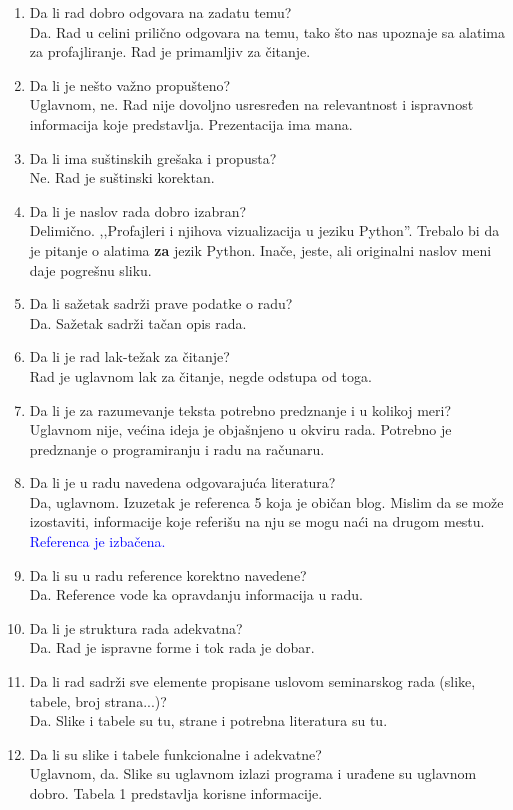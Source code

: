 \documentclass[a4paper]{report}
\newcommand{\odgovor}[1]{\textcolor{blue}{#1}}
\begin{document}
\begin{enumerate}
\item Da li rad dobro odgovara na zadatu temu?\\ Da. Rad u celini prilično odgovara na temu, tako što nas upoznaje sa alatima za profajliranje. Rad je primamljiv za čitanje.
\item Da li je nešto važno propušteno?\\ Uglavnom, ne. Rad nije dovoljno usresređen na relevantnost i ispravnost informacija koje predstavlja. Prezentacija ima mana.
\item Da li ima suštinskih grešaka i propusta?\\ Ne. Rad je suštinski korektan.
\item Da li je naslov rada dobro izabran?\\ Delimično. ,,Profajleri i njihova vizualizacija u jeziku Python''. Trebalo bi da je pitanje o alatima \textbf{za} jezik Python. Inače, jeste, ali originalni naslov meni daje pogrešnu sliku.
\item Da li sažetak sadrži prave podatke o radu?\\ Da. Sažetak sadrži tačan opis rada.
\item Da li je rad lak-težak za čitanje?\\ Rad je uglavnom lak za čitanje, negde odstupa od toga.
\item Da li je za razumevanje teksta potrebno predznanje i u kolikoj meri?\\ Uglavnom nije, većina ideja je objašnjeno u okviru rada. Potrebno je predznanje o programiranju i radu na računaru.
\item Da li je u radu navedena odgovarajuća literatura?\\ Da, uglavnom. Izuzetak je referenca 5 koja je običan blog. Mislim da se može izostaviti, informacije koje referišu na nju se mogu naći na drugom mestu.\\
\odgovor{Referenca je izbačena.}
\item Da li su u radu reference korektno navedene?\\ Da. Reference vode ka opravdanju informacija u radu.
\item Da li je struktura rada adekvatna?\\ Da. Rad je ispravne forme i tok rada je dobar.
\item Da li rad sadrži sve elemente propisane uslovom seminarskog rada (slike, tabele, broj strana...)?\\ Da. Slike i tabele su tu, strane i potrebna literatura su tu.
\item Da li su slike i tabele funkcionalne i adekvatne?\\ Uglavnom, da. Slike su uglavnom izlazi programa i urađene su uglavnom dobro. Tabela 1 predstavlja korisne informacije.
\end{enumerate}
\end{document}
